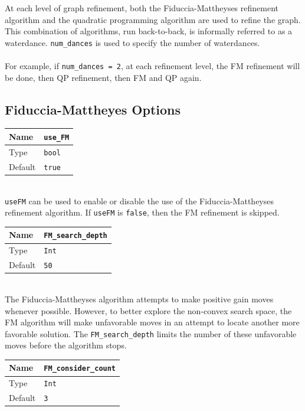 \documentclass[letter]{article}
\begin{document}
At each level of graph refinement, both the Fiduccia-Mattheyses refinement algorithm and the quadratic programming algorithm are used to refine the graph. This combination of algorithms, run back-to-back, is informally referred to as a waterdance. \texttt{num\_dances} is used to specify the number of waterdances.\\
\\
For example, if \texttt{num\_dances = 2}, at each refinement level, the FM refinement will be done, then QP refinement, then FM and QP again.

\subsection{Fiduccia-Mattheyes Options}

\begin{tabular}{|l|l|} \hline
Name & \texttt{use\_FM} \\ \hline
Type & \texttt{bool} \\ \hline
Default & \texttt{true} \\ \hline
\end{tabular}\\

\texttt{useFM} can be used to enable or disable the use of the Fiduccia-Mattheyses refinement algorithm. If \texttt{useFM} is \texttt{false}, then the FM refinement is skipped.\\

\begin{tabular}{|l|l|} \hline
Name & \texttt{FM\_search\_depth} \\ \hline
Type & \texttt{Int} \\ \hline
Default & \texttt{50} \\ \hline
\end{tabular}\\

The Fiduccia-Mattheyses algorithm attempts to make positive gain moves whenever possible. However, to better explore the non-convex search space, the FM algorithm will make unfavorable moves in an attempt to locate another more favorable solution. The \texttt{FM\_search\_depth} limits the number of these unfavorable moves before the algorithm stops.

\baselineskip
\begin{tabular}{|l|l|} \hline
Name & \texttt{FM\_consider\_count} \\ \hline
Type & \texttt{Int} \\ \hline
Default & \texttt{3} \\ \hline
\end{tabular}\\
\end{document}
